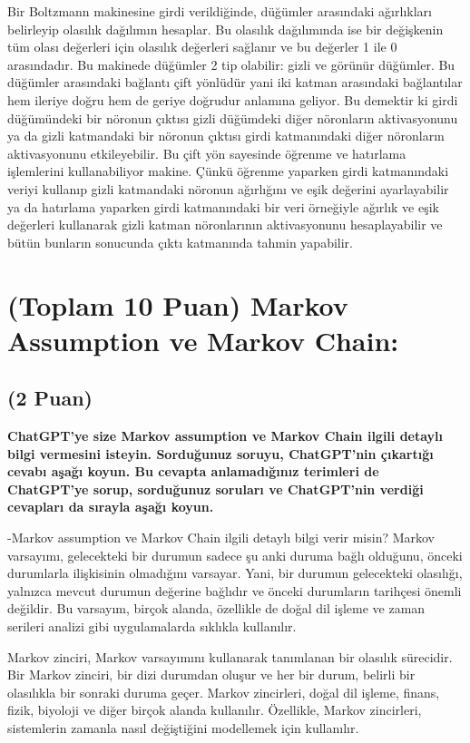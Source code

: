 \documentclass[11pt]{article}
\begin{document}
Bir Boltzmann makinesine girdi verildiğinde, düğümler arasındaki ağırlıkları belirleyip olasılık dağılımın hesaplar. Bu olasılık dağılımında ise bir değişkenin tüm olası değerleri için olasılık değerleri sağlanır ve bu değerler 1 ile 0 arasındadır. Bu makinede düğümler 2 tip olabilir: gizli ve görünür düğümler. Bu düğümler arasındaki bağlantı çift yönlüdür yani iki katman arasındaki bağlantılar hem ileriye doğru hem de geriye doğrudur anlamına geliyor. Bu demektir ki girdi düğümündeki bir nöronun çıktısı gizli düğümdeki diğer nöronların aktivasyonunu ya da gizli katmandaki bir nöronun çıktısı girdi katmanındaki diğer nöronların aktivasyonunu etkileyebilir. Bu çift yön sayesinde öğrenme ve hatırlama işlemlerini kullanabiliyor makine. Çünkü öğrenme yaparken girdi katmanındaki veriyi kullanıp gizli katmandaki nöronun ağırlığını ve eşik değerini ayarlayabilir ya da hatırlama yaparken girdi katmanındaki bir veri örneğiyle ağırlık ve eşik değerleri kullanarak gizli katman nöronlarının aktivasyonunu hesaplayabilir ve bütün bunların sonucunda çıktı katmanında tahmin yapabilir.

\section{(Toplam 10 Puan) Markov Assumption ve Markov Chain:}

\subsection{(2 Puan)} \textbf{ChatGPT’ye size Markov assumption ve Markov Chain ilgili detaylı bilgi vermesini isteyin. Sorduğunuz soruyu, ChatGPT'nin çıkartığı cevabı aşağı koyun. Bu cevapta anlamadığınız terimleri de ChatGPT’ye sorup, sorduğunuz soruları ve ChatGPT’nin verdiği cevapları da sırayla aşağı koyun.}

-Markov assumption ve Markov Chain ilgili detaylı bilgi verir misin?
Markov varsayımı, gelecekteki bir durumun sadece şu anki duruma bağlı olduğunu, önceki durumlarla ilişkisinin olmadığını varsayar. Yani, bir durumun gelecekteki olasılığı, yalnızca mevcut durumun değerine bağlıdır ve önceki durumların tarihçesi önemli değildir. Bu varsayım, birçok alanda, özellikle de doğal dil işleme ve zaman serileri analizi gibi uygulamalarda sıklıkla kullanılır.

Markov zinciri, Markov varsayımını kullanarak tanımlanan bir olasılık sürecidir. Bir Markov zinciri, bir dizi durumdan oluşur ve her bir durum, belirli bir olasılıkla bir sonraki duruma geçer. Markov zincirleri, doğal dil işleme, finans, fizik, biyoloji ve diğer birçok alanda kullanılır. Özellikle, Markov zincirleri, sistemlerin zamanla nasıl değiştiğini modellemek için kullanılır.
\end{document}
